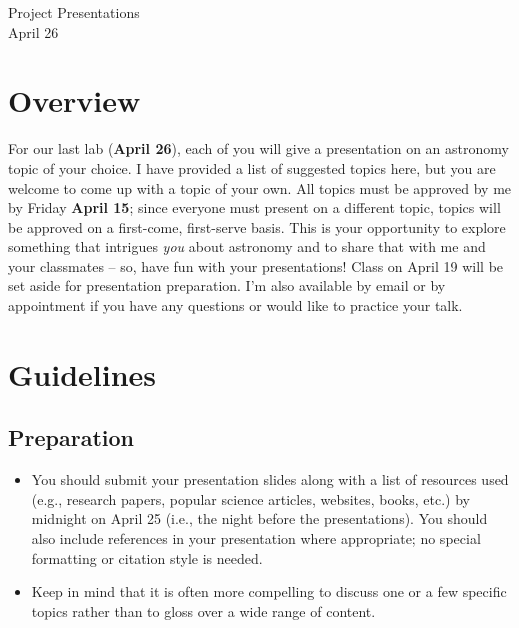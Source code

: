 \documentclass[11pt]{article}
\begin{document}
\begin{center}
\huge{Project Presentations}\\ \medskip \Large{April 26}
\end{center}

\section{Overview}
For our last lab (\textbf{April 26}), each of you will give a presentation on an astronomy topic of your choice.  I have provided a list of suggested topics here, but you are welcome to come up with a topic of your own.  All topics must be approved by me by Friday \textbf{April 15}; since everyone must present on a different topic, topics will be approved on a first-come, first-serve basis.  This is your opportunity to explore something that intrigues \textit{you} about astronomy and to share that with me and your classmates -- so, have fun with your presentations!  Class on April 19 will be set aside for presentation  preparation. I'm also available by email or by appointment if you have any questions or would like to practice your talk.

\section{Guidelines}
\subsection*{Preparation}
\begin{itemize}
    \item You should submit your presentation slides along with a list of resources used (e.g., research papers, popular science articles, websites, books, etc.) by midnight on April 25 (i.e., the night before the presentations). You should also include references in your presentation where appropriate; no special formatting or citation style is needed.
    \item Keep in mind that it is often more compelling to discuss one or a few specific topics rather than to gloss over a wide range of content.
\end{itemize}
\end{document}
